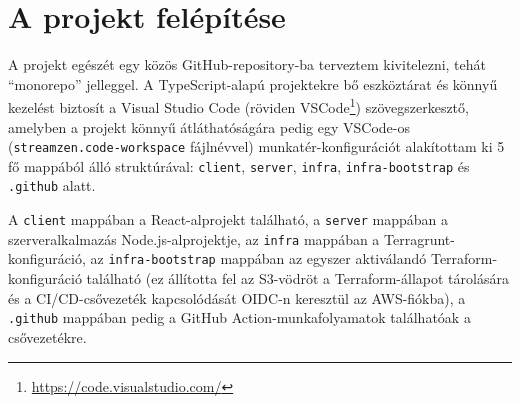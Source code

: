 \section{A projekt felépítése}

A projekt egészét egy közös GitHub-repository-ba terveztem kivitelezni, tehát ``monorepo'' jelleggel. A TypeScript-alapú projektekre bő eszköztárat és könnyű kezelést biztosít a Visual Studio Code (röviden VSCode\footnote{\url{https://code.visualstudio.com/}}) szövegszerkesztő, amelyben a projekt könnyű átláthatóságára pedig egy VSCode-os (\verb|streamzen.code-workspace| fájlnévvel) munkatér-konfigurációt alakítottam ki 5 fő mappából álló struktúrával: \verb|client|, \verb|server|, \verb|infra|, \verb|infra-bootstrap| és \verb|.github| alatt.

A \verb|client| mappában a React-alprojekt található, a \verb|server| mappában a szerveralkalmazás Node.js-alprojektje, az \verb|infra| mappában a Terragrunt-konfiguráció, az \verb|infra-bootstrap| mappában az egyszer aktiválandó Terraform-konfiguráció található (ez állította fel az S3-vödröt a Terraform-állapot tárolására és a CI/CD-csővezeték kapcsolódását OIDC-n keresztül az AWS-fiókba), a \verb|.github| mappában pedig a GitHub Action-munkafolyamatok találhatóak a csővezetékre.
